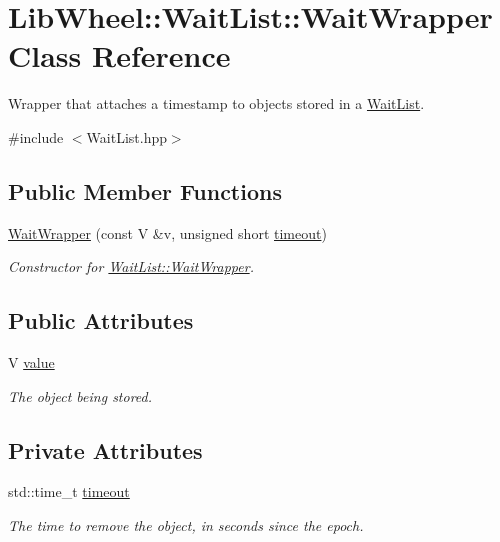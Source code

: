 \hypertarget{classLibWheel_1_1WaitList_1_1WaitWrapper}{
\section{\-Lib\-Wheel\-:\-:\-Wait\-List\-:\-:\-Wait\-Wrapper \-Class \-Reference}
\label{classLibWheel_1_1WaitList_1_1WaitWrapper}
}


\-Wrapper that attaches a timestamp to objects stored in a \hyperlink{classLibWheel_1_1WaitList}{\-Wait\-List}.  




{\ttfamily \#include $<$\-Wait\-List.\-hpp$>$}

\subsection*{\-Public \-Member \-Functions}
\begin{DoxyCompactItemize}
\item 
\hyperlink{classLibWheel_1_1WaitList_1_1WaitWrapper_ae19fba6c4c852f12ae8c94537d55c1fe}{\-Wait\-Wrapper} (const \-V \&v, unsigned short \hyperlink{classLibWheel_1_1WaitList_1_1WaitWrapper_ab6e7098923788076c6041df2ec845925}{timeout})
\begin{DoxyCompactList}\small\item\em \-Constructor for \hyperlink{classLibWheel_1_1WaitList_1_1WaitWrapper}{\-Wait\-List\-::\-Wait\-Wrapper}. \end{DoxyCompactList}\end{DoxyCompactItemize}
\subsection*{\-Public \-Attributes}
\begin{DoxyCompactItemize}
\item 
\-V \hyperlink{classLibWheel_1_1WaitList_1_1WaitWrapper_a343d0e2af0e140f50a42fc3019483706}{value}
\begin{DoxyCompactList}\small\item\em \-The object being stored. \end{DoxyCompactList}\end{DoxyCompactItemize}
\subsection*{\-Private \-Attributes}
\begin{DoxyCompactItemize}
\item 
std\-::time\-\_\-t \hyperlink{classLibWheel_1_1WaitList_1_1WaitWrapper_ab6e7098923788076c6041df2ec845925}{timeout}
\begin{DoxyCompactList}\small\item\em \-The time to remove the object, in seconds since the epoch. \end{DoxyCompactList}\end{DoxyCompactItemize}

